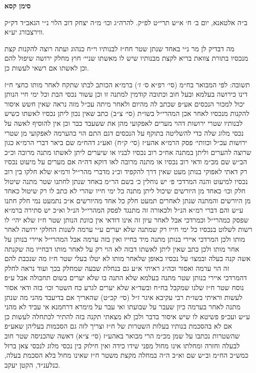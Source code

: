 \documentclass[12pt, openany]{book}
\newcommand{\chapname}{}
\newcommand{\newchap}[1]{
	\addcontentsline{toc}{chapter}{#1}
	\renewcommand{\chapname}{#1}
		\begin{center}
			\textbf{%
\fontsize{16pt}{16pt}\selectfont
				#1}
		\end{center}
}
\begin{document}
\newchap{סימן קסא}
\begin{multicols}{2}
ב״ה אלטאנא, יום ב׳ ח׳ א״ש תרי״ט לפ״ק. להרה״ג וכו׳ מ״ה יצחק דוב הלוי נ״י הגאב״ד דק״ק ווירצבורג יע״א.\\\vspace{0pt}

מה דבדיק לן מר נ״י באחד שנתן שטר חח״ז לבנותיו וי״ח כנהוג ועתה רוצה להקנות קצת מנכסיו בתורת צוואת בריא לקצת מבנותיו שיש לו מאשתו שניי׳ חוץ מחלק ירושה שיפול להם וכן לאשתו אם רשאי לעשות כן.\\\vspace{0pt}

תשובה: לפי המבואר בח״מ (סי׳ רפ״א ס׳ ז׳) ברמ״א הכותב לבתו שתקח לאחר מותו כחצי ח״ז דינו כירושה בעלמא ובעל חוב וכתובה קודמין למתנה זו וכן עשור נכסי הבת וכל ימי חיי הנותן יכול למכור הנכסים אע״פ שכתב לה מהיום ולאחר מיתה עכ״ל מזה נראה שאין חשש איסור להקנות מנכסיו לאחר אכן המהרי״ל בשו״ת (סי׳ צ״ב) כתב שאין נכון ליתן נכסיו לאשתו כשיש לבנותיו שטרי ירושות דהוי מערים לאפקועי מהן את ששעבד כבר וכן אין להוסיף לאשה על נכסי מלוג שלה כדי להשליטה בתוקף על הנכסים דגם התם הוי כהערמה לאפקועי מן שטרי ירושות עכ״ל וכוותי׳ פסק הרמ״א אהע״ז (סי׳ ק״ח) ואע״ג דהח״מ שם ביאר דברי הרמ״א כגון שרוצה להערים וליתן במתנה אח״כ רוב נכסיו לבניו או שיערים ליתן לאשתו מתנה מרובה וכ״כ הב״ש שם מכ״מ ודאי רוב נכסיו או מתנה מרובה לאו דוקא דה״ה אם מערים על מיעוט נכסיו רק דאתי לאפוקי בנותן מעט שאין דרך להקפיד וכ״נ מדברי מהר״יל ורמ״א שלא חלקו בין רוב נכסיו למיעוט והנה המרדכי פ׳ יש נוחלין כ׳ בשם הר״מ באחד שנתן לחתנו שטר מתנה שיטול חלק וכו׳ כאחד מן היורשים שיכול ליתן מתנה כל ימי חייו שהרי לא כתב לו רק שיטול כאחד מן היורשים והמתנה שנתן לאחרים תמעט חלק כל אחד מהיורשים א״כ נתמעט נמי חלק חתנו ע״ש והם דברי רמ״א הנ״ל ולכאורה זה מתנגד לפסק המהרי״ל הנ״ל וא״כ יש סתירה ברמ״א שפסק כמהרי״ל וכמרדכי אבל לאחר עיון זה אינו דודאי אין כוונת הנותן שטר ח״ז שלא יהי׳ לו רשות לשלוט בנכסיו כל ימי חייו רק שמתנה שלא יערים ע״י ערמה לשנות החלקי ירושה לאחר מותו ולכן המרדכי איירי בנותן מתנה מיד בחייו ואין בזה ערמה אבל המהרי״ל איירי בנותן על אחר מותו ולכן כתב שאין ליתן לאשתו דבזה לא הוי רק על לאחר מותו דבחייו מה שקנתה אשה קנה בעלה ובמצו׳ על נכסיו באופן שלאחר מותו לא יטלו בעלי שטר ח״ז מה שנכבת להם זה הוי ערמה ואסור וכה״ג ראיתי א״ע גם בנחלת שבעה שמחלק בכך ועוד נראה לחלק דהמרדכי איירי בנותן שטר מתנה בעלמא שלא התנה בו שלא יערים בשום תחבולה אבל ע״פ נוסח שטר ח״ז שלנו שמקבל בח״ח ובשד״א שלא יערים לגרע כח השטר וכו׳ בזה ודאי אסור לעשות וראיתי בשו״ת רבי עקיבא איגר ז״ל (סי׳ קכ״ט) שהאריך אם בדיעבד מהני מה שנתן מתנה לאחר בערמה כיון שעבר על שבועתו ואי עבר על מימרא דרחמנא אי עביד לא מהני ע״ש ועכ״פ פשיטא לו שיש איסור בדבר ולכן לא מצאתי תקנה בזה להתיר לכתחלה לעשות כן אם לא בהסכמת בנותיו בעלות השטרות של ח״ז וצריך לזה גם הסכמות בעליהן שאע״פ שהשטרות נכתבו על שמן מכ״מ הרי מבואר באהע״ז (סי׳ צ״א) דאשה שהכניסה שטר חוב לבעלה וחזרה ומחלתו אינו מחול מפני שידו כידה ואין חילוק בין נכסי מלוג לנכסי צאן ברזל כמש״כ הח״מ וב״ש שם וא״כ ה״ה במחלה מקצת משטר ח״ז שאינו מחול בלא הסכמת בעלה, כנלענ״ד, הקטן יעקב.\\\vspace{0pt}

\end{multicols}\newpage
\end{document}
